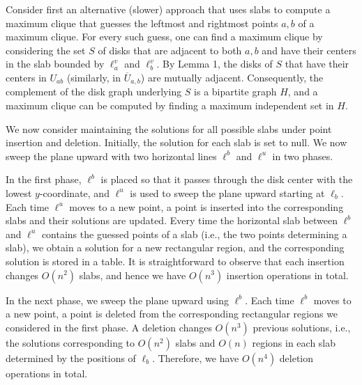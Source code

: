 \par
\par
Consider first an alternative (slower) approach that uses slabs to compute a maximum clique that guesses the leftmost and rightmost points $a,b$ of a maximum clique. For every such guess, one can find a maximum clique by considering the set $S$ of disks that are adjacent to both $a,b$ and have their centers in the slab bounded by $\ell^{v}_{a}$ and $\ell^{v}_{b}$. By Lemma 1, the disks of $S$ that have their centers in $U_{ab}$ (similarly, in $\overline{U}_{a,b}$) are mutually adjacent. Consequently, the complement of the disk graph underlying $S$ is a bipartite graph $H$, and a maximum clique can be computed by finding a maximum independent set in $H$.
\par
\par
We now consider maintaining the solutions for all possible slabs under point insertion and deletion. Initially, the solution for each slab is set to null. We now sweep the plane upward with two horizontal lines $\ell^{b}$ and $\ell^{u}$ in two phases.
\par
\par
In the first phase, $\ell^{b}$ is placed so that it passes through the disk center with the lowest $y$-coordinate, and $\ell^{u}$ is used to sweep the plane upward starting at $\ell_{b}$. Each time $\ell^{u}$ moves to a new point, a point is inserted into the corresponding slabs and their solutions are updated. Every time the horizontal slab between $\ell^{b}$ and $\ell^{u}$ contains the guessed points of a slab (i.e., the two points determining a slab), we obtain a solution for a new rectangular region, and the corresponding solution is stored in a table. It is straightforward to observe that each insertion changes $O(n^{2})$ slabs, and hence we have $O(n^{3})$ insertion operations in total.
\par
\par
In the next phase, we sweep the plane upward using $\ell^{b}$. Each time $\ell^{b}$ moves to a new point, a point is deleted from the corresponding rectangular regions we considered in the first phase. A deletion changes $O(n^{3})$ previous solutions, i.e., the solutions corresponding to $O(n^{2})$ slabs and $O(n)$ regions in each slab determined by the positions of $\ell_{b}$. Therefore, we have $O(n^{4})$ deletion operations in total.
\par
\par
